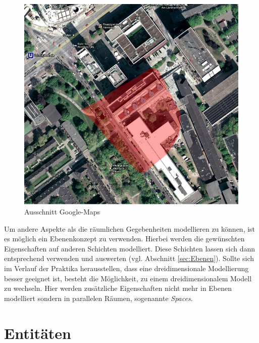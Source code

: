 \documentclass[10pt]{scrartcl}
\begin{document}
	\begin{figure}[H]
        \centering
                \includegraphics[width=\textwidth]{img/google_maps}
        \caption{Ausschnitt Google-Maps}
        \label{img:google_maps}
	\end{figure}         
  
        
        
        Um andere Aspekte als die räumlichen Gegebenheiten modellieren zu können, ist es möglich ein Ebenenkonzept zu verwenden. Hierbei werden die gewünschten Eigenschaften auf anderen Schichten modelliert. Diese Schichten lassen sich dann entsprechend verwenden und auswerten (vgl. Abschnitt \ref{sec:Ebenen}).
Sollte sich im Verlauf der Praktika herausstellen, dass eine dreidimensionale Modellierung besser geeignet ist, besteht die Möglichkeit, zu einem dreidimensionalem Modell zu wechseln. Hier werden zusätzliche Eigenschaften nicht mehr in Ebenen modelliert sondern in parallelen Räumen, sogenannte \textit{Spaces}.

\section{Entitäten}
\end{document}
